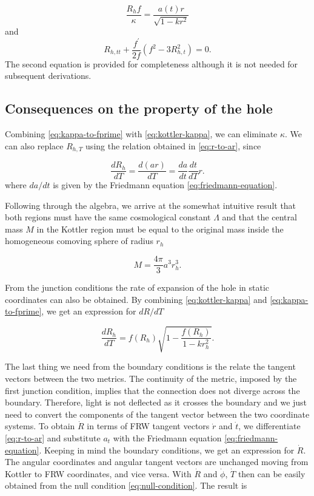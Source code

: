 \begin{equation}
  \frac{R_h f}{\kappa} = \frac{a(t)r}{\sqrt{1-kr^2}}
  \label{eq:kappa-to-fprime}
\end{equation}
and
\begin{equation}
  R_{h,tt} + \frac{f^{\prime}}{2f}(f^2 - 3R_{h,t}^2) = 0.
\end{equation}
The second equation is provided for completeness although it is not needed for subsequent derivations. 

\subsection{Consequences on the property of the hole}

Combining \autoref{eq:kappa-to-fprime} with \autoref{eq:kottler-kappa}, we can eliminate $\kappa$. We can also replace $R_{h,T}$ using the relation obtained in \autoref{eq:r-to-ar}, since

\begin{equation}
  \frac{dR_h}{dT} = \frac{d(ar)}{dT} = \frac{da}{dt}\frac{dt}{dT}r.
\end{equation}
where $da/dt$ is given by the Friedmann equation \ref{eq:friedmann-equation}. 

Following through the algebra, we arrive at the somewhat intuitive result that both regions must have the same cosmological constant $\Lambda$ and that the central mass $M$ in the Kottler region must be equal to the original mass inside the homogeneous comoving sphere of radius $r_h$

\begin{equation}
  M = \frac{4\pi}{3} a^3 r_h^3. 
  \label{eq:junction-conditions-mass-volume}
\end{equation}

From the junction conditions the rate of expansion of the hole in static coordinates can also be obtained. By combining \autoref{eq:kottler-kappa} and \autoref{eq:kappa-to-fprime}, we get an expression for $dR/dT$

\begin{equation}
  \frac{dR_h}{dT} = f(R_h) \sqrt{1- \frac{f(R_h)}{1-k r_h^2}}.
  \label{eq:hole-expansion-in-kottler-dR-dT}
\end{equation}

The last thing we need from the boundary conditions is the relate the tangent vectors between the two metrics. The continuity of the metric, imposed by the first junction condition, implies that the connection does not diverge across the boundary. Therefore, light is not deflected as it crosses the boundary and we just need to convert the components of the tangent vector between the two coordinate systems. To obtain $\dot{R}$ in terms of FRW tangent vectors $\dot{r}$ and $\dot{t}$, we differentiate \autoref{eq:r-to-ar} and substitute $a_t$ with the Friedmann equation \autoref{eq:friedmann-equation}. Keeping in mind the boundary conditions, we get an expression for $\dot{R}$. The angular coordinates and angular tangent vectors are unchanged moving from Kottler to FRW coordinates, and vice versa. With $\dot{R}$ and $\dot{\phi}$, $\dot{T}$ then can be easily obtained from the null condition \autoref{eq:null-condition}. The result is

